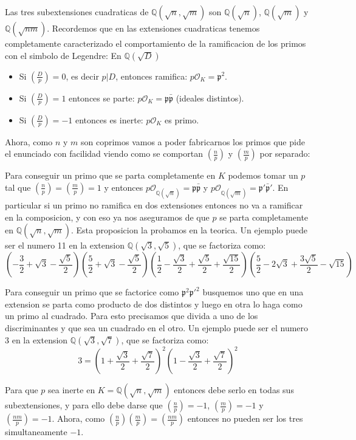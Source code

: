 \documentclass[12pt]{amsart}
\newcommand{\QQ}{\mathbb{Q}}
\newcommand{\pp}{\mathfrak{p}}
\newcommand{\OO}{\mathcal{O}}
\newcommand{\leg}[2]{\left( \frac{#1}{#2} \right)}
\newcommand{\lp}{\left(}
\newcommand{\rp}{\right)}
\theoremstyle{plain}
\begin{document}
Las tres subextensiones cuadraticas de $\QQ(\sqrt{n},\sqrt{m})$ son $\QQ(\sqrt{n})$, $\QQ(\sqrt{m})$ y $\QQ(\sqrt{nm})$. Recordemos que en las extensiones cuadraticas tenemos completamente caracterizado el comportamiento de la ramificacion de los primos con el simbolo de Legendre: En $\QQ(\sqrt{D})$
\begin{itemize}
    \item Si $\leg{D}{p}=0$, es decir $p|D$, entonces ramifica: $p\OO_K = \pp^2$.
    \item Si $\leg{D}{p}=1$ entonces se parte: $p\OO_K = \pp\bar{\pp}$ (ideales distintos).
    \item Si $\leg{D}{p}=-1$ entonces es inerte: $p\OO_K$ es primo.
\end{itemize}

Ahora, como $n$ y $m$ son coprimos vamos a poder fabricarnos los primos que pide el enunciado con facilidad viendo como se comportan $\leg{n}{p}$ y $\leg{m}{p}$ por separado:

Para conseguir un primo que se parta completamente en $K$ podemos tomar un $p$ tal que $\leg{n}{p} = \leg{m}{p} = 1$ y entonces $p\OO_{\QQ(\sqrt{n})} = \pp \bar{\pp}$ y $p\OO_{\QQ(\sqrt{m})} =\pp' \bar{\pp}'$. En particular si un primo no ramifica en dos extensiones entonces no va a ramificar en la composicion, y con eso ya nos aseguramos de que $p$ se parta completamente en $\QQ(\sqrt{n},\sqrt{m})$. Esta proposicion la probamos en la teorica. Un ejemplo puede ser el numero 11 en la extension $\QQ(\sqrt{3},\sqrt{5})$, que se factoriza como:
$$\lp-\frac{3}{2}+\sqrt{3}-\frac{\sqrt{5}}{2}\rp
\lp\frac{5}{2}+\sqrt{3}-\frac{\sqrt{5}}{2}\rp
\lp\frac{1}{2}-\frac{\sqrt{3}}{2}+\frac{\sqrt{5}}{2}+\frac{\sqrt{15}}{2}\rp
\lp\frac{5}{2}-2\sqrt{3}+\frac{3\sqrt{5}}{2}-\sqrt{15}\rp$$

Para conseguir un primo que se factorice como $\pp^2\pp'^2$ busquemos uno que en una extension se parta como producto de dos distintos y luego en otra lo haga como un primo al cuadrado. Para esto precisamos que divida a uno de los discriminantes y que sea un cuadrado en el otro. Un ejemplo puede ser el numero 3 en la extension $\QQ(\sqrt{3},\sqrt{7})$, que se factoriza como:
$$3= \lp 1 +\frac{\sqrt{3}}{2} + \frac{\sqrt{7}}{2}\rp^2
\lp   1 -\frac{\sqrt{3}}{2} + \frac{\sqrt{7}}{2}\rp^2$$

Para que $p$ sea inerte en $K = \QQ(\sqrt{n},\sqrt{m})$ entonces debe serlo en todas sus subextensiones, y para ello debe darse que $\leg{n}{p}=-1$, $\leg{m}{p}=-1$ y $\leg{nm}{p}=-1$. Ahora, como $\leg{n}{p}\leg{m}{p}=\leg{nm}{p}$ entonces no pueden ser los tres simultaneamente $-1$.
\end{document}
